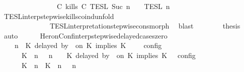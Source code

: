 \begin{isabellebody}
\ \ \ \ \ \ \ \ \ \ \ \ \ \ {\isasyminter}\ {\isasymlbrakk}\ {\isacharparenleft}C\ kills\ C\ {\isasymrbrakk}\isactrlsub T\isactrlsub E\isactrlsub S\isactrlsub L\isactrlbsup {\isasymge}\ Suc\ n\isactrlesup \ {\isasyminter}\ {\isasymlbrakk}{\isasymlbrakk}\ {\isasymPsi}\ {\isasymrbrakk}{\isasymrbrakk}\isactrlsub T\isactrlsub E\isactrlsub S\isactrlsub L\isactrlbsup {\isasymge}\ n\isactrlesup {\isacartoucheclose}\isanewline
\ \ \ \ \ \ \ \ \isamarkupfalse%
\ TESL{\isacharunderscore}interp{\isacharunderscore}stepwise{\isacharunderscore}kills{\isacharunderscore}coind{\isacharunderscore}unfold\isanewline
\ \ \ \ \ \ \ \ \ \ \ \ \ \ TESL{\isacharunderscore}interpretation{\isacharunderscore}stepwise{\isacharunderscore}cons{\isacharunderscore}morph\ \isamarkupfalse%
\ blast\isanewline
\ \ \ \ \ \ \isamarkupfalse%
\ {\isacharquery}thesis\ \isamarkupfalse%
\ auto\isanewline
\ \ \ \ \isamarkupfalse%
\isanewline
{}\isamarkupfalse%
%
\endisatagproof
{\isafoldproof}%
%
\isadelimproof
\isanewline
%
\endisadelimproof
\isanewline
{}\isamarkupfalse%
\ HeronConf{\isacharunderscore}interp{\isacharunderscore}stepwise{\isacharunderscore}delayed{\isacharunderscore}cases{\isacharunderscore}zero{\isacharcolon}\isanewline
\ \ {\isacartoucheopen}{\isasymlbrakk}\ {\isasymGamma}{\isacharcomma}\ n\ {\isasymturnstile}\ {\isacharparenleft}{\isacharparenleft}K\ delayed\ by\ {}\ on\ K\ implies\ K\ {\isacharhash}\ {\isasymPsi}{\isacharparenright}\ {\isasymtriangleright}\ {\isasymPhi}\ {\isasymrbrakk}\isactrlsub c\isactrlsub o\isactrlsub n\isactrlsub f\isactrlsub i\isactrlsub g\isanewline
\ \ \ \ {\isacharequal}\ {\isasymlbrakk}\ {\isacharparenleft}{\isacharparenleft}K\ {\isasymnot}{\isasymUp}\ n{\isacharparenright}\ {\isacharhash}\ {\isasymGamma}{\isacharparenright}{\isacharcomma}\ n\ {\isasymturnstile}\ {\isasymPsi}\ {\isasymtriangleright}\ {\isacharparenleft}{\isacharparenleft}K\ delayed\ by\ {}\ on\ K\ implies\ K\ {\isacharhash}\ {\isasymPhi}{\isacharparenright}\ {\isasymrbrakk}\isactrlsub c\isactrlsub o\isactrlsub n\isactrlsub f\isactrlsub i\isactrlsub g\isanewline
\ \ \ \ {\isasymunion}\ {\isasymlbrakk}\ {\isacharparenleft}{\isacharparenleft}K\ {\isasymUp}\ n{\isacharparenright}\ {\isacharhash}\ {\isacharparenleft}K\ {\isasymUp}\ n{\isacharparenright}\ {\isacharhash}\ {\isasymGamma}{\isacharparenright}{\isacharcomma}\ n\isanewline

\end{isabellebody}
